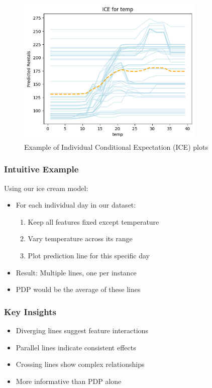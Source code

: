\documentclass{article}
\begin{document}
\begin{figure}[h]
    \centering
    \includegraphics[width=0.8\textwidth]{images/ice.png}
    \caption{Example of Individual Conditional Expectation (ICE) plots}
    \label{fig:ice}
\end{figure}

\subsubsection{Intuitive Example}
Using our ice cream model:
\begin{itemize}
    \item For each individual day in our dataset:
    \begin{enumerate}
        \item Keep all features fixed except temperature
        \item Vary temperature across its range
        \item Plot prediction line for this specific day
    \end{enumerate}
    \item Result: Multiple lines, one per instance
    \item PDP would be the average of these lines
\end{itemize}

\subsubsection{Key Insights}
\begin{itemize}
    \item Diverging lines suggest feature interactions
    \item Parallel lines indicate consistent effects
    \item Crossing lines show complex relationships
    \item More informative than PDP alone
\end{itemize}
\end{document}
